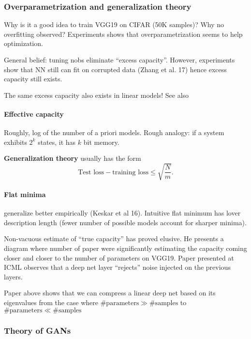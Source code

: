 \documentclass[11pt,oneside,a4paper]{scrartcl}
\begin{document}
\subsubsection{Overparametrization and generalization theory}
\label{sec:overp-nand-gener}

Why is it a good idea to train VGG19 on CIFAR (50K samples)? Why no overfitting observed?
Experiments shows that overparametrization seems to help optimization.

General belief: tuning nobs eliminate ``excess capacity''. However,
experiments show that NN still can fit on corrupted data (Zhang et
al. 17) hence excess capacity still exists.

The same excess capacity also exists in linear models! See also \cite{belkin18a}

\paragraph{Effective capacity} Roughly, log of the number of a priori
models. Rough analogy: if a system exhibits $2^k$ states, it has $k$ bit memory.

\textbf{Generalization theory} usually has the form
$$\text{Test loss} - \text{training loss} \leq \sqrt{\frac{N}{m}}.$$

\paragraph{Flat minima} generalize better empirically (Keskar et al
16). Intuitive flat minimum has lover description length (fewer
number of possible models account for sharper minima).

Non-vacuous estimate of ``true capacity'' has proved elusive. 
He presents a diagram where number of paper were significantly
estimating the capacity coming closer and closer to the number of
parameters on VGG19. Paper presented at ICML \cite{arora18b} observes
that a deep net layer ``rejects'' noise injected on the previous layers. 

Paper above shows that we can compress a linear deep net based on its
eigenvalues from the case where $\#\text{parameters} \gg \#\text{samples}$ to $\#\text{parameters}
\ll \#\text{samples}$

\subsubsection{Theory of GANs}
\label{sec:theory-gans}
\end{document}
